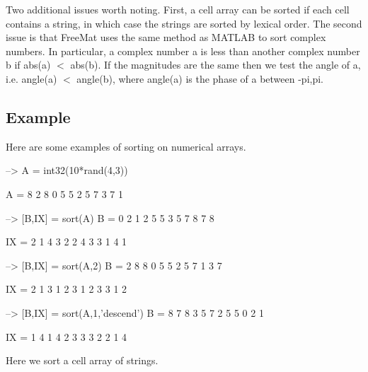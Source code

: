 Two additional issues worth noting. First, a cell array can be sorted if each cell contains a {\ttfamily string}, in which case the strings are sorted by lexical order. The second issue is that Free\-Mat uses the same method as M\-A\-T\-L\-A\-B to sort complex numbers. In particular, a complex number {\ttfamily a} is less than another complex number {\ttfamily b} if {\ttfamily abs(a) $<$ abs(b)}. If the magnitudes are the same then we test the angle of {\ttfamily a}, i.\-e. {\ttfamily angle(a) $<$ angle(b)}, where {\ttfamily angle(a)} is the phase of {\ttfamily a} between {\ttfamily -\/pi,pi}. \hypertarget{variables_struct_Example}{}\subsection{Example}\label{variables_struct_Example}
Here are some examples of sorting on numerical arrays.


\begin{DoxyVerbInclude}
--> A = int32(10*rand(4,3))

A = 
 8 2 8 
 0 5 5 
 2 5 7 
 3 7 1 

--> [B,IX] = sort(A)
B = 
 0 2 1 
 2 5 5 
 3 5 7 
 8 7 8 

IX = 
 2 1 4 
 3 2 2 
 4 3 3 
 1 4 1 

--> [B,IX] = sort(A,2)
B = 
 2 8 8 
 0 5 5 
 2 5 7 
 1 3 7 

IX = 
 2 1 3 
 1 2 3 
 1 2 3 
 3 1 2 

--> [B,IX] = sort(A,1,'descend')
B = 
 8 7 8 
 3 5 7 
 2 5 5 
 0 2 1 

IX = 
 1 4 1 
 4 2 3 
 3 3 2 
 2 1 4 
\end{DoxyVerbInclude}


Here we sort a cell array of strings.


